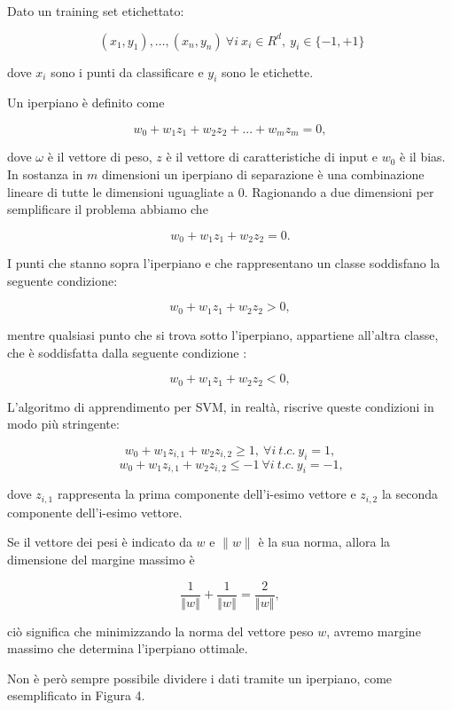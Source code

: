 \documentclass[12pt,italian]{report}
\begin{document}
Dato un training set etichettato:

\begin{center}
	\[
	\ (x_1, y_1), ..., (x_n, y_n)
	\ \forall i 
	\ x_i \in R^{d},
	\ y_i \in  \{ -1, +1 \}
	\]
\end{center}
dove $x_i$ sono i punti da classificare e $y_i$ sono le etichette.

Un iperpiano è definito come 
\begin{center}
	\[w_0 + w_1z_1 + w_2z_2 +...+ w_mz_m= 0,\]
\end{center}
dove $\omega$ è il vettore di peso, $z$ è il vettore di caratteristiche di input e $w_0$ è il bias.
In sostanza in $m$ dimensioni un iperpiano di separazione è una combinazione lineare di tutte le dimensioni uguagliate a 0.
Ragionando a due dimensioni per semplificare il problema abbiamo che 
\begin{center}
	\[w_0 + w_1z_1 + w_2z_2 = 0.\]
\end{center}
I punti che stanno sopra l'iperpiano e che rappresentano un classe soddisfano la seguente condizione:
\begin{center}
	\[w_0 + w_1z_1+w_2z_2 > 0,\]
\end{center}
mentre qualsiasi punto che si trova sotto l'iperpiano, appartiene all'altra classe, che è soddisfatta dalla seguente condizione :
\begin{center}
	\[w_0 + w_1z_1+w_2z_2 < 0,\]
\end{center}
L'algoritmo di apprendimento per SVM, in realtà, riscrive queste condizioni in modo più stringente:
\begin{center}
	\[w_0 + w_1z_{i,1}+w_2z_{i,2} \geq 1,
	\ \forall i 
	\ t.c. 
	\ y_i=1,\]
	\[
	\ w_0 + w_1z_{i,1}+w_2z_{i,2} \leq -1 
	\ \forall i 
	\ t.c.
	\ y_i = -1,\]
\end{center}
dove $z_{i,1}$ rappresenta la prima componente dell'i-esimo vettore e $z_{i,2}$ la seconda componente dell'i-esimo vettore.

Se il vettore dei pesi è indicato da $w$ e $\parallel w \parallel$ è la sua norma, allora la dimensione del margine massimo è 
\begin{center}
	\[ \frac{1}{\left \Vert w \right \Vert} + \frac{1}{\left \Vert w \right \Vert} = \frac{2}{\left \Vert w \right \Vert},\]
\end{center}
ciò significa che minimizzando la norma del vettore peso $w$, avremo margine massimo che determina l'iperpiano ottimale.

Non è però sempre possibile dividere i dati tramite un iperpiano, come esemplificato in Figura 4.
\end{document}
